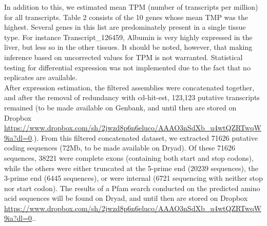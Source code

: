 \documentclass[12pt]{article}
\begin{document}
In addition to this, we estimated mean TPM (number of transcripts per million) for all transcripts. {\hypertarget{Table 2}{Table 2}} consists of the 10 genes whose mean TMP was the highest. Several genes in this list are predominately  present in a single tissue type. For instance Transcript\_126459, Albumin is very highly expressed in the liver, but less so in the other tissues. It should be noted, however, that making inference based on uncorrected values for TPM is not warranted. Statistical testing for differential expression was not implemented due to the fact that no replicates are available.  \\  

After expression estimation, the filtered assemblies were concatenated together, and after the removal of redundancy with cd-hit-est, 123,123 putative transcripts remained (to be made available on Genbank, and until then are stored on Dropbox \url{https://www.dropbox.com/sh/2jwzd8p6n6eluco/AAAO3nSdXb_u4wtQZRTwqW9ia?dl=0}.). From this filtered concatenated dataset, we extracted 71626 putative coding sequences (72Mb, to be made available on Dryad). Of these 71626 sequences, 38221 were complete exons (containing both start and stop codons), while the others were either truncated at the 5-prime end (20239 sequences), the 3-prime end (6445 sequences), or were internal (6721 sequencing with neither stop nor start codon). The results of a Pfam search conducted on the predicted amino acid sequences will be found on Dryad, and until then are stored on Dropbox \url{https://www.dropbox.com/sh/2jwzd8p6n6eluco/AAAO3nSdXb_u4wtQZRTwqW9ia?dl=0}.. \\
\end{document}
